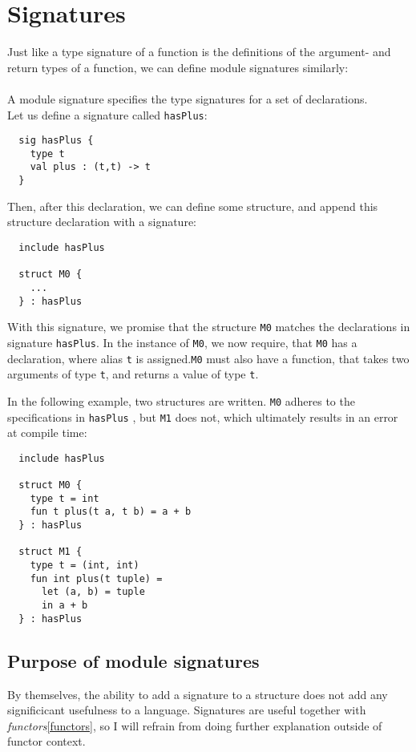 \section{Signatures}
Just like a type signature of a function is the definitions of the argument- and
return types of a function, we can define module signatures similarly:\\\\
A module signature specifies the type signatures for a set of declarations.\\
Let us define a signature called \texttt{hasPlus}:
\begin{lstlisting}
  sig hasPlus {
    type t
    val plus : (t,t) -> t
  }
\end{lstlisting}

Then, after this declaration, we can define some structure, and append this
structure declaration with a signature:
\begin{lstlisting}
  include hasPlus
  
  struct M0 {
    ...
  } : hasPlus
\end{lstlisting}
With this signature, we promise that the structure \texttt{M0} matches the declarations
in signature \texttt{hasPlus}.
In the instance of \texttt{M0}, we now require, that \texttt{M0} has a
declaration, where alias \texttt{t} is assigned.\texttt{M0} must also have a
function, that takes two arguments of type \texttt{t}, and returns a value of
type \texttt{t}.

In the following example, two structures are written. \texttt{M0} adheres to the
specifications in \texttt{hasPlus} , but \texttt{M1} does not, which ultimately results in an
error at compile time:

\begin{lstlisting}
  include hasPlus
  
  struct M0 {
    type t = int
    fun t plus(t a, t b) = a + b
  } : hasPlus
  
  struct M1 {
    type t = (int, int)
    fun int plus(t tuple) =
      let (a, b) = tuple
      in a + b
  } : hasPlus
\end{lstlisting}
\subsection{Purpose of module signatures}
By themselves, the ability to add a signature to a structure does not add any
significicant usefulness to a language. Signatures are useful together with
\textit{functors}\ref{functors}, so I will refrain from doing further
explanation outside of functor context.


